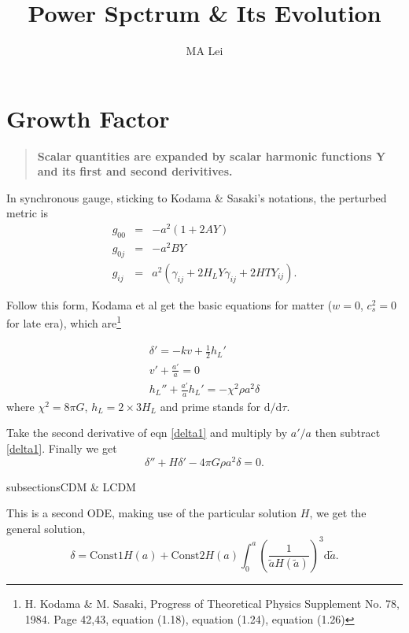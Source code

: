 \documentclass{article}
\begin{document}
\title{Power Spctrum \& Its Evolution}
\author{MA Lei}



\section{Growth Factor}

\begin{quote}
\bf {Scalar quantities are expanded by scalar harmonic functions Y and its first and second derivitives.}
\end{quote}

In synchronous gauge, sticking to Kodama \& Sasaki's notations, the perturbed metric is
\begin{eqnarray*}
g_{00}&=&-a^2(1+2AY) \\
g_{0j}&=&-a^2BY \\
g_{ij}&=&a^2(\gamma_{ij}+2H_LY\gamma_{ij}+2HTY_{ij}).
\end{eqnarray*}



Follow this form, Kodama et al get the basic equations for matter ($w=0$, $c_s^2=0$ for late era), which are\footnote{H. Kodama \& M. Sasaki, Progress of Theoretical Physics Supplement No. 78, 1984. Page 42,43, equation (1.18), equation (1.24), equation (1.26)}



\begin{eqnarray}
\delta'=-kv+\frac 1 2 h_L'  \label{delta1} \\
v'+\frac{a'}{a}=0 \label{v1} \\
h_L''+\frac{a'}{a}h_L'=-\chi^2\rho a^2 \delta \label{hL1}
\end{eqnarray}
where $\chi^2=8\pi G$, $h_L=2\times 3H_L$ and prime stands for $\mathrm d/\mathrm d\tau$.

Take the second derivative of eqn \ref{delta1} and multiply by $a'/a$ then subtract \ref{delta1}. Finally we get 
\begin{equation}
\delta''+H\delta'-4\pi G \rho a^2 \delta=0      .
\end{equation}

subsection{sCDM \& LCDM}

This is a second ODE, making use of the particular solution $H$, we get the general solution,
\begin{equation}
\delta=\text{Const1}H(a)+\text{Const2}H(a)\int_0^a(\frac{1}{\tilde a H(\tilde a)})^3\mathrm d\tilde a      .
\end{equation}
\end{document}
